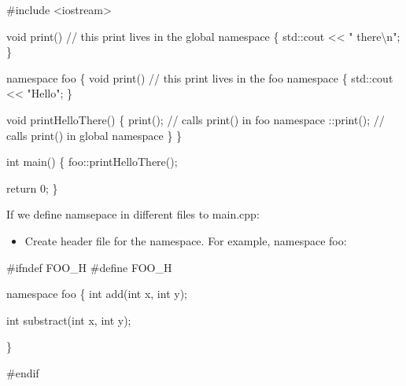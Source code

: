 \documentclass[
  letterpaper,
  DIV=11,
  numbers=noendperiod]{scrreprt}
\newenvironment{Shaded}{\begin{snugshade}}{\end{snugshade}}
\newcommand{\CommentTok}[1]{\textcolor[rgb]{0.37,0.37,0.37}{#1}}
\newcommand{\ControlFlowTok}[1]{\textcolor[rgb]{0.00,0.23,0.31}{#1}}
\newcommand{\DecValTok}[1]{\textcolor[rgb]{0.68,0.00,0.00}{#1}}
\newcommand{\ErrorTok}[1]{\textcolor[rgb]{0.68,0.00,0.00}{#1}}
\newcommand{\FunctionTok}[1]{\textcolor[rgb]{0.28,0.35,0.67}{#1}}
\newcommand{\NormalTok}[1]{\textcolor[rgb]{0.00,0.23,0.31}{#1}}
\newcommand{\SpecialCharTok}[1]{\textcolor[rgb]{0.37,0.37,0.37}{#1}}
\newcommand{\StringTok}[1]{\textcolor[rgb]{0.13,0.47,0.30}{#1}}
\providecommand{\tightlist}{%
  \setlength{\itemsep}{0pt}\setlength{\parskip}{0pt}}\usepackage{longtable,booktabs,array}
\begin{document}
\begin{Shaded}
\begin{Highlighting}[]
\CommentTok{\#include \textless{}iostream\textgreater{}}

\NormalTok{void }\FunctionTok{print}\NormalTok{() }\SpecialCharTok{/}\ErrorTok{/}\NormalTok{ this print lives }\ControlFlowTok{in}\NormalTok{ the global namespace}
\NormalTok{\{}
\NormalTok{    std}\SpecialCharTok{::}\NormalTok{cout }\SpecialCharTok{\textless{}}\ErrorTok{\textless{}} \StringTok{" there}\SpecialCharTok{\textbackslash{}n}\StringTok{"}\NormalTok{;}
\NormalTok{\}}

\NormalTok{namespace foo}
\NormalTok{\{}
\NormalTok{    void }\FunctionTok{print}\NormalTok{() }\SpecialCharTok{/}\ErrorTok{/}\NormalTok{ this print lives }\ControlFlowTok{in}\NormalTok{ the foo namespace}
\NormalTok{    \{}
\NormalTok{        std}\SpecialCharTok{::}\NormalTok{cout }\SpecialCharTok{\textless{}}\ErrorTok{\textless{}} \StringTok{"Hello"}\NormalTok{;}
\NormalTok{    \}}

\NormalTok{    void }\FunctionTok{printHelloThere}\NormalTok{()}
\NormalTok{    \{}
        \FunctionTok{print}\NormalTok{(); }\SpecialCharTok{/}\ErrorTok{/}\NormalTok{ calls }\FunctionTok{print}\NormalTok{() }\ControlFlowTok{in}\NormalTok{ foo namespace}
        \SpecialCharTok{::}\FunctionTok{print}\NormalTok{(); }\SpecialCharTok{/}\ErrorTok{/}\NormalTok{ calls }\FunctionTok{print}\NormalTok{() }\ControlFlowTok{in}\NormalTok{ global namespace}
\NormalTok{    \}}
\NormalTok{\}}

\NormalTok{int }\FunctionTok{main}\NormalTok{()}
\NormalTok{\{}
\NormalTok{    foo}\SpecialCharTok{::}\FunctionTok{printHelloThere}\NormalTok{();}

\NormalTok{    return }\DecValTok{0}\NormalTok{;}
\NormalTok{\}}
\end{Highlighting}
\end{Shaded}

If we define namsepace in different files to main.cpp:

\begin{itemize}
\tightlist
\item
  Create header file for the namespace. For example, namespace foo:
\end{itemize}

\begin{Shaded}
\begin{Highlighting}[]
\CommentTok{\#ifndef FOO\_H}
\CommentTok{\#define FOO\_H}

\NormalTok{namespace foo}
\NormalTok{\{}
\NormalTok{    int }\FunctionTok{add}\NormalTok{(int x, int y);}

\NormalTok{    int }\FunctionTok{substract}\NormalTok{(int x, int y);}

\NormalTok{\}}

\CommentTok{\#endif}
\end{Highlighting}
\end{Shaded}
\end{document}
